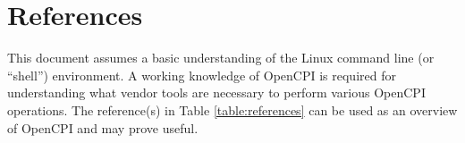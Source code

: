 \tableofcontents

\newpage

\section{References}

	This document assumes a basic understanding of the Linux command line (or ``shell'') environment. A working knowledge of OpenCPI is required for understanding what vendor tools are necessary to perform various OpenCPI operations.
The reference(s) in Table \ref{table:references} can be used as an overview of OpenCPI and may prove useful.
\def\refcapbottom{}
\def\myreferences{
\hline
HDL Development Guide &
\githubio{OpenCPI\_HDL\_Development.pdf} \\
}



